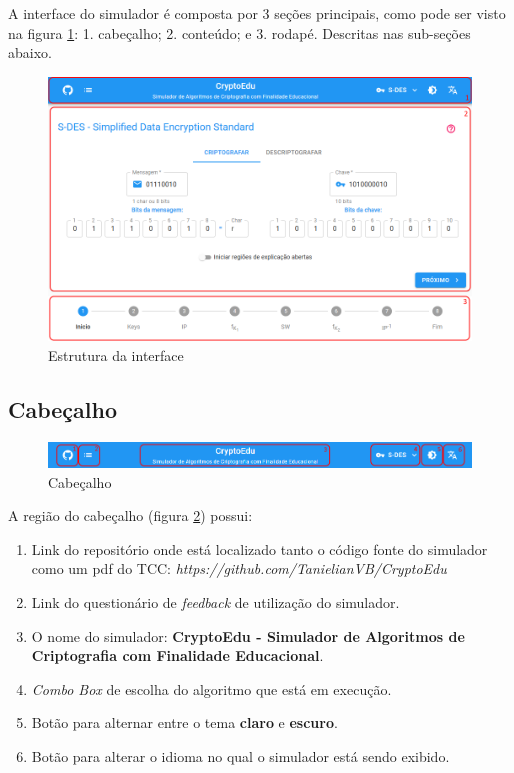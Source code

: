 A interface do simulador é composta por 3 seções principais, como pode ser visto na figura \ref{fig:uiestrutura}: 1. cabeçalho; 2. conteúdo; e 3. rodapé. Descritas nas sub-seções abaixo.

\begin{figure}[H]
    \centering
    \caption{Estrutura da interface}
    \label{fig:uiestrutura}
    \includegraphics[width=1\linewidth]{UI/UIEstrutura.png}
\end{figure}

\subsection{Cabeçalho}

\begin{figure}[H]
    \centering
    \caption{Cabeçalho}
    \label{fig:uicabecalho}
    \includegraphics[width=1\linewidth]{UI/UIHeader.png}
\end{figure}

A região do cabeçalho (figura \ref{fig:uicabecalho}) possui:
\begin{enumerate}
    \item Link do repositório onde está localizado tanto o código fonte do simulador como um pdf do TCC: \textit{https://github.com/TanielianVB/CryptoEdu}
    \item Link do questionário de \textit{feedback} de utilização do simulador.
    \item O nome do simulador: \textbf{CryptoEdu - Simulador de Algoritmos de Criptografia com Finalidade Educacional}.
    \item \textit{Combo Box} de escolha do algoritmo que está em execução.
    \item Botão para alternar entre o tema \textbf{claro} e \textbf{escuro}.
    \item Botão para alterar o idioma no qual o simulador está sendo exibido.
\end{enumerate}


